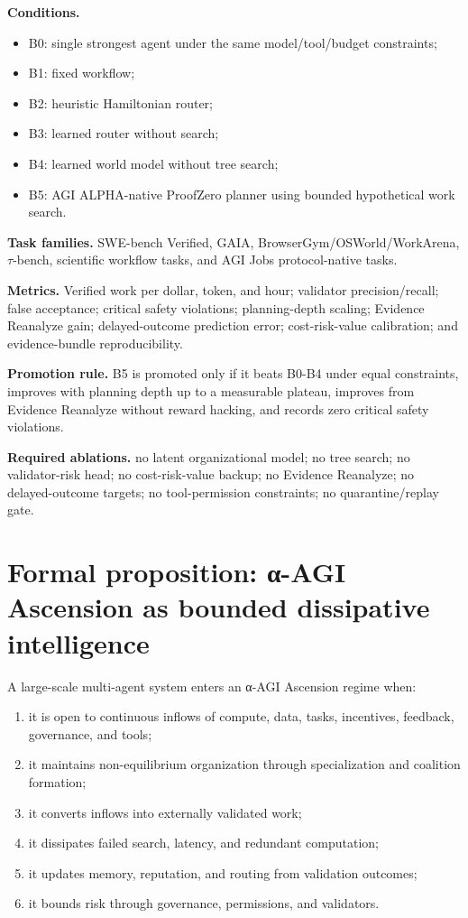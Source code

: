 \documentclass[11pt]{article}
\providecommand{\tightlist}{\setlength{\itemsep}{0pt}\setlength{\parskip}{0pt}}
\begin{document}
\textbf{Conditions.}

\begin{itemize}
\tightlist
\item
  B0: single strongest agent under the same model/tool/budget
  constraints;
\item
  B1: fixed workflow;
\item
  B2: heuristic Hamiltonian router;
\item
  B3: learned router without search;
\item
  B4: learned world model without tree search;
\item
  B5: AGI ALPHA-native ProofZero planner using bounded hypothetical work
  search.
\end{itemize}

\textbf{Task families.} SWE-bench Verified, GAIA,
BrowserGym/OSWorld/WorkArena, \(\tau\)-bench, scientific workflow tasks,
and AGI Jobs protocol-native tasks.

\textbf{Metrics.} Verified work per dollar, token, and hour; validator
precision/recall; false acceptance; critical safety violations;
planning-depth scaling; Evidence Reanalyze gain; delayed-outcome
prediction error; cost-risk-value calibration; and evidence-bundle
reproducibility.

\textbf{Promotion rule.} B5 is promoted only if it beats B0-B4 under
equal constraints, improves with planning depth up to a measurable
plateau, improves from Evidence Reanalyze without reward hacking, and
records zero critical safety violations.

\textbf{Required ablations.} no latent organizational model; no tree
search; no validator-risk head; no cost-risk-value backup; no Evidence
Reanalyze; no delayed-outcome targets; no tool-permission constraints;
no quarantine/replay gate.

\section{Formal proposition: α-AGI Ascension as bounded dissipative
intelligence}\label{formal-proposition-ux3b1-agi-ascension-as-bounded-dissipative-intelligence}

A large-scale multi-agent system enters an α-AGI Ascension regime when:

\begin{enumerate}
\def\labelenumi{\arabic{enumi}.}
\tightlist
\item
  it is open to continuous inflows of compute, data, tasks, incentives,
  feedback, governance, and tools;
\item
  it maintains non-equilibrium organization through specialization and
  coalition formation;
\item
  it converts inflows into externally validated work;
\item
  it dissipates failed search, latency, and redundant computation;
\item
  it updates memory, reputation, and routing from validation outcomes;
\item
  it bounds risk through governance, permissions, and validators.
\end{enumerate}
\end{document}
